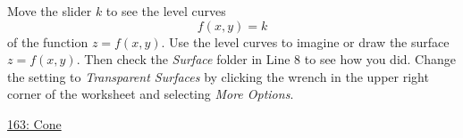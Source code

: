 \documentclass{ximera}
\begin{document}
\begin{example}  \label{Ed44mlk45}
Move the slider $k$ to see the level curves 
\[
    f(x,y)=k
\]
of the function $z=f(x,y)$. Use the level curves to imagine or draw the surface $z=f(x,y)$. Then check the \emph{Surface} folder in Line 8 to see how you did. Change the setting to \emph{Transparent Surfaces} by clicking the wrench in the upper right corner of the worksheet and selecting \emph{More Options}.


 
\begin{onlineOnly}
    \begin{center}
\end{center}
\end{onlineOnly}


 
\href{https://www.desmos.com/3d/vgyxfvgsyp}{163: Cone}
\end{example}
\end{document}
